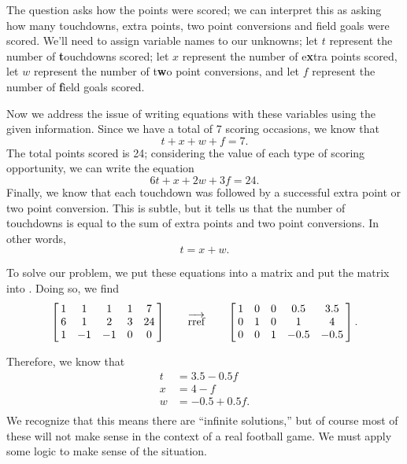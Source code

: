 {The question asks how the points were scored; we can interpret this as asking how many touchdowns, extra points, two point conversions and field goals were scored. We'll need to assign variable names to our unknowns; let $t$ represent the number of \textbf{t}ouchdowns scored; let $x$ represent the number of e\textbf xtra points scored, let $w$ represent the number of t\textbf wo point conversions, and let $f$ represent the number of \textbf field goals scored.

Now we address the issue of writing equations with these variables using the given information. Since we have a total of 7 scoring occasions, we know that $$t+x+w+f=7.$$ The total points scored is 24; considering the value of each type of scoring opportunity, we can write the equation $$6t+x+2w+3f = 24.$$ Finally, we know that each touchdown was followed by a successful extra point or two point conversion. This is subtle, but it tells us that the number of touchdowns is equal to the sum of extra points and two point conversions. In other words, $$t = x+w.$$


To solve our problem, we put these equations into a matrix and put the matrix into \rref. Doing so, we find $$\bmx{ccccc}1&1&1&1&7\\ 6&1&2&3&24\\1&-1&-1&0&0\\ \emx \quad\quad\overrightarrow{\text{rref}}\quad\quad \bmx{ccccc} 1&0&0&0.5&3.5\\0&1&0&1&4\\ 0&0&1&-0.5&-0.5\\ \emx.$$

Therefore, we know that \begin{align*} t &=3.5-0.5f\\ x&=4-f\\ w&=-0.5+0.5f. \\ \end{align*} We recognize that this means there are ``infinite solutions,'' but of course most of these will not make sense in the context of a real football game. We must apply some logic to make sense of the situation.

}
